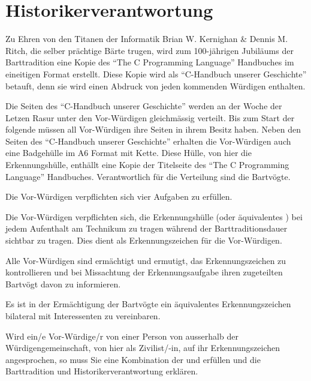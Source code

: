 \documentclass[fontsize=12pt,parskip=half]{scrartcl}
\begin{document}
\pagebreak
\section{Historikerverantwortung}
\begin{contract}

  \Clause[title={``C-Handbuch unserer Geschichte''}]
  Zu Ehren von den Titanen der Informatik Brian W. Kernighan \& Dennis M. Ritch, die selber prächtige Bärte trugen,
  wird zum 100-jährigen Jubiläums der Barttradition eine Kopie des ``The C Programming Language'' Handbuches im
  eineitigen Format erstellt. Diese Kopie wird als ``C-Handbuch unserer Geschichte'' betauft, denn sie wird einen
  Abdruck von jeden kommenden Würdigen enthalten.

  \Clause[title={Verteilung}]
  Die Seiten des ``C-Handbuch unserer Geschichte'' werden an der Woche der Letzen Rasur unter den Vor-Würdigen gleichmässig verteilt.
  Bis zum Start der folgende müssen all Vor-Würdigen ihre Seiten in ihrem Besitz haben. Neben den Seiten des ``C-Handbuch unserer Geschichte''
  erhalten die Vor-Würdigen auch eine Badgehülle im A6 Format mit Kette. Diese Hülle, von hier die Erkennungshülle, enthällt eine Kopie der
  Titelseite des ``The C Programming Language'' Handbuches. Verantwortlich für die Verteilung sind die Bartvögte.

  \Clause[title={Erkennungs-, Schutz-, Vorweis-, Wissensaufgabe}] \label{H.aufgaben}
  Die Vor-Würdigen verpflichten sich vier Aufgaben zu erfüllen.

  \SubClause[title={Erkennungsaufgabe}]\label{H.erkennungsaufgabe}
  Die Vor-Würdigen verpflichten sich, die Erkennungshülle (oder äquivalentes ) bei jedem Aufenthalt am Technikum zu tragen während der
  Barttraditionsdauer sichtbar zu tragen. Dies dient als Erkennungszeichen für die Vor-Würdigen.

  Alle Vor-Würdigen sind ermächtigt und ermutigt, das Erkennungszeichen zu kontrollieren und bei Missachtung der Erkennungsaufgabe ihren zugeteilten Bartvögt davon zu informieren.

  Es ist in der Ermächtigung der Bartvögte ein äquivalentes Erkennungszeichen bilateral mit Interessenten zu vereinbaren.\label{aequivalentes}

  Wird ein/e Vor-Würdige/r von einer Person von ausserhalb der Würdigengemeinschaft, von hier als Zivilist/-in, auf ihr Erkennungszeichen angesprochen, so muss Sie eine Kombination
  der  und  erfüllen und die Barttradition und Historikerverantwortung  erklären.


\end{contract}
\end{document}
